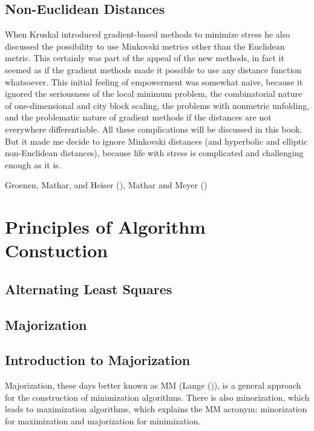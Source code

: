 \documentclass[
  12pt,
  letterpaper,
  DIV=11,
  numbers=noendperiod]{scrartcl}
\begin{document}
\subsection{Non-Euclidean Distances}\label{non-euclidean-distances}

When Kruskal introduced gradient-based methods to minimize stress he
also discussed the possibility to use Minkovski metrics other than the
Euclidean metric. This certainly was part of the appeal of the new
methods, in fact it seemed as if the gradient methods made it possible
to use any distance function whatsoever. This initial feeling of
empowerment was somewhat naive, because it ignored the seriousness of
the local minimum problem, the combinatorial nature of one-dimensional
and city block scaling, the problems with nonmetric unfolding, and the
problematic nature of gradient methods if the distances are not
everywhere differentiable. All these complications will be discussed in
this book. But it made me decide to ignore Minkovski distances (and
hyperbolic and elliptic non-Euclidean distances), because life with
stress is complicated and challenging enough as it is.

Groenen, Mathar, and Heiser
(), Mathar and Meyer
()

\section{Principles of Algorithm
Constuction}\label{principles-of-algorithm-constuction}

\subsection{Alternating Least
Squares}\label{alternating-least-squares-1}

\subsection{Majorization}\label{majorization-1}

\subsection{Introduction to
Majorization}\label{introduction-to-majorization}

Majorization, these days better known as MM (Lange
()), is a general approach for the
construction of minimization algorithms. There is also minorization,
which leads to maximization algorithms, which explains the MM acronym:
minorization for maximization and majorization for minimization.
\end{document}

